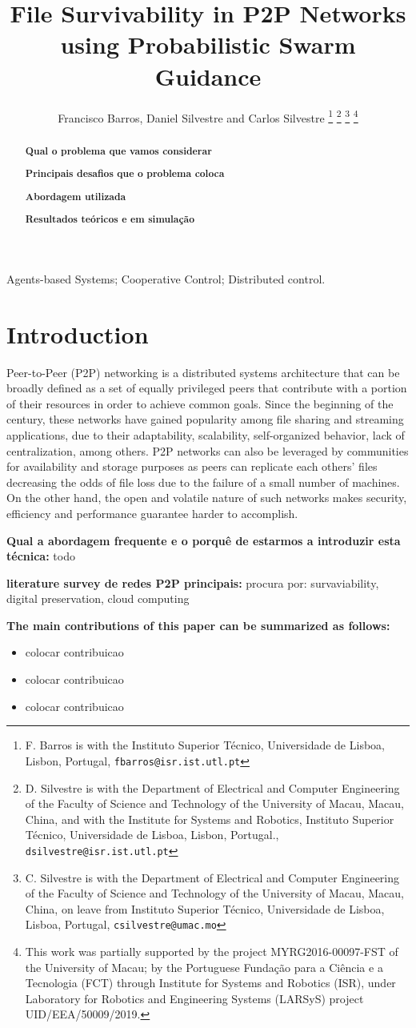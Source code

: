 \documentclass[letterpaper, 10 pt, conference]{ieeeconf}
\title {File Survivability in P2P Networks using Probabilistic Swarm Guidance}
\author {Francisco Barros, Daniel Silvestre and Carlos Silvestre
\thanks {F. Barros is with the Instituto Superior Técnico, Universidade de  Lisboa, Lisbon, Portugal, {\tt\small fbarros@isr.ist.utl.pt}}
\thanks {D. Silvestre is with the Department of Electrical and Computer Engineering of the Faculty of Science and Technology of the University of Macau, Macau, China, and with the Institute for Systems and Robotics, Instituto Superior T\'ecnico, Universidade de Lisboa, Lisbon, Portugal., {\tt\small dsilvestre@isr.ist.utl.pt}}
\thanks {C. Silvestre is with the Department of Electrical and Computer Engineering of the Faculty of Science and Technology of the University of Macau, Macau, China, on leave from Instituto Superior T\'ecnico, Universidade de Lisboa, Lisboa, Portugal, {\tt\small csilvestre@umac.mo}}
\thanks {This work was partially supported by the project MYRG2016-00097-FST of the University of Macau; by the Portuguese Fundação para a Ciência e a Tecnologia (FCT) through Institute for Systems and Robotics (ISR), under Laboratory for Robotics and Engineering Systems (LARSyS) project UID/EEA/50009/2019.}}
\begin{document}
\renewcommand{\baselinestretch}{1}

\maketitle
\thispagestyle{empty}
\pagestyle{empty}

\begin{abstract}
	\textbf{Qual o problema que vamos considerar}

	\textbf{Principais desafios que o problema coloca}

	\textbf{Abordagem utilizada}

	\textbf{Resultados teóricos e em simulação}
\end{abstract}

\begin{keywords}
	Agents-based Systems; Cooperative Control; Distributed control.
\end{keywords}

\section{Introduction}
Peer-to-Peer (P2P) networking is a distributed systems architecture that can be broadly defined as a set of equally privileged peers that contribute with a portion of their resources in order to achieve common goals. Since the beginning of the century, these networks have gained popularity \cite{ssaroiu:msp2pfss} among file sharing and streaming applications, due to their adaptability, scalability, self-organized behavior, lack of centralization, among others. P2P networks can also be leveraged by communities for availability and storage purposes as peers can replicate each others' files decreasing the odds of file loss due to the failure of a small number of machines. On the other hand, the open and volatile nature of such networks makes security, efficiency and performance guarantee harder to accomplish.\newline

\textbf{Qual a abordagem frequente e o porquê de estarmos a introduzir esta técnica:} todo\newline

\textbf{literature survey de redes P2P principais:} procura por: survaviability, digital preservation, cloud computing\newline

\textbf{The main contributions of this paper can be summarized as follows:}
\begin{itemize}
	\item colocar contribuicao
	\item colocar contribuicao
	\item colocar contribuicao
\end{itemize}
\end{document}
